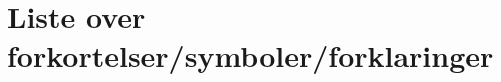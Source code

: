 \documentclass[12pt, norsk]{article}
\begin{document}

\begin{titlepage}      %

\end{titlepage}

\pagestyle{fancy}       %
\renewcommand{\headrulewidth}{0pt}   %
\fancyhead{}            %
\fancyfoot{}
\fancyfoot[R]{\thepage} %
\normalfont             %

\newpage

\newpage

\tableofcontents %
\section*{Liste over forkortelser/symboler/forklaringer}
\listoffigures   %
\listoftables    %
\newpage

\setcounter{page}{1}   %




\newpage




\newpage




\newpage


\newpage


\newpage


\newpage



\printbibliography
\newpage

\setcounter{page}{1}  %
\appendix

\end{document}
